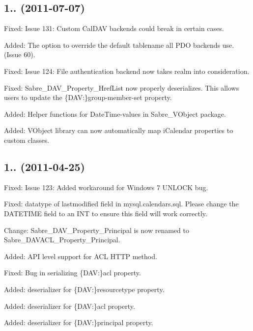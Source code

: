 \subsection*{1.. (2011-\/07-\/07) }


\begin{DoxyItemize}
\item Fixed\+: Issue 131\+: Custom Cal\+D\+AV backends could break in certain cases.
\item Added\+: The option to override the default tablename all P\+DO backends use. (Issue 60).
\item Fixed\+: Issue 124\+: \textquotesingle{}File\textquotesingle{} authentication backend now takes realm into consideration.
\item Fixed\+: Sabre\+\_\+\+D\+A\+V\+\_\+\+Property\+\_\+\+Href\+List now properly deserializes. This allows users to update the \{D\+AV\+:\}group-\/member-\/set property.
\item Added\+: Helper functions for Date\+Time-\/values in Sabre\+\_\+\+V\+Object package.
\item Added\+: V\+Object library can now automatically map i\+Calendar properties to custom classes.
\end{DoxyItemize}

\subsection*{1.. (2011-\/04-\/25) }


\begin{DoxyItemize}
\item Fixed\+: Issue 123\+: Added workaround for Windows 7 U\+N\+L\+O\+CK bug.
\item Fixed\+: datatype of lastmodified field in mysql.\+calendars.\+sql. Please change the D\+A\+T\+E\+T\+I\+ME field to an I\+NT to ensure this field will work correctly.
\item Change\+: Sabre\+\_\+\+D\+A\+V\+\_\+\+Property\+\_\+\+Principal is now renamed to Sabre\+\_\+\+D\+A\+V\+A\+C\+L\+\_\+\+Property\+\_\+\+Principal.
\item Added\+: A\+PI level support for A\+CL H\+T\+TP method.
\item Fixed\+: Bug in serializing \{D\+AV\+:\}acl property.
\item Added\+: deserializer for \{D\+AV\+:\}resourcetype property.
\item Added\+: deserializer for \{D\+AV\+:\}acl property.
\item Added\+: deserializer for \{D\+AV\+:\}principal property.
\end{DoxyItemize}

